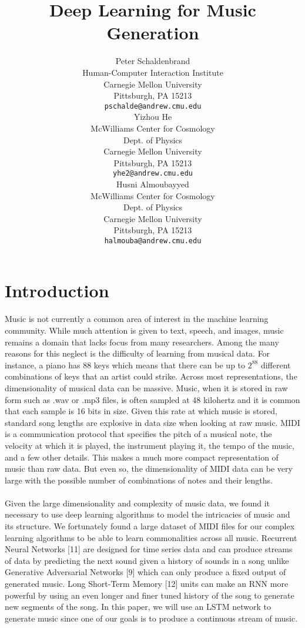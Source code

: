\documentclass[final]{article}
\title{Deep Learning for Music Generation}
\author{
   Peter  Schaldenbrand\\
  Human-Computer Interaction Institute \\
   Carnegie Mellon University \\
     Pittsburgh, PA 15213 \\
   \texttt{pschalde@andrew.cmu.edu} \\
     \And
   Yizhou He \\
  McWilliams Center for Cosmology\\
  Dept. of Physics \\
  Carnegie Mellon University\\
  Pittsburgh, PA 15213 \\
  \texttt{yhe2@andrew.cmu.edu} \\
  \And
   Husni Almoubayyed\\
  McWilliams Center for Cosmology\\
  Dept. of Physics \\
  Carnegie Mellon University\\
  Pittsburgh, PA 15213 \\
  \texttt{halmouba@andrew.cmu.edu} \\}
\begin{document}

\maketitle

\section{Introduction}

\paragraph{}Music is not currently a common area of interest in the machine learning community.  While much attention is given to text, speech, and images, music remains a domain that lacks focus from many researchers.  Among the many reasons for this neglect is the difficulty of learning from musical data.  For instance, a piano has 88 keys which means that there can be up to $2^{88}$ different combinations of keys that an artist could strike.  Across most representations, the dimensionality of musical data can be massive.  Music, when it is stored in raw form such as .wav or .mp3 files, is often sampled at 48 kilohertz and it is common that each sample is 16 bits in size.  Given this rate at which music is stored, standard song lengths are explosive in data size when looking at raw music.  MIDI is a communication protocol that specifies the pitch of a musical note, the velocity at which it is played, the instrument playing it, the tempo of the music, and a few other details.  This makes a much more compact representation of music than raw data.  But even so, the dimensionality of MIDI data can be very large with the possible number of combinations of notes and their lengths.
\paragraph{}Given the large dimensionality and complexity of music data, we found it necessary to use deep learning algorithms to model the intricacies of music and its structure.  We fortunately found a large dataset of MIDI files for our complex learning algorithms to be able to learn commonalities across all music.  Recurrent Neural Networks [11] are designed for time series data and can produce streams of data by predicting the next sound given a history of sounds in a song unlike Generative Adversarial Networks [9] which can only produce a fixed output of generated music.  Long Short-Term Memory [12] units can make an RNN more powerful by using an even longer and finer tuned history of the song to generate new segments of the song.  In this paper, we will use an LSTM network to generate music since one of our goals is to produce a continuous stream of music.
\end{document}
